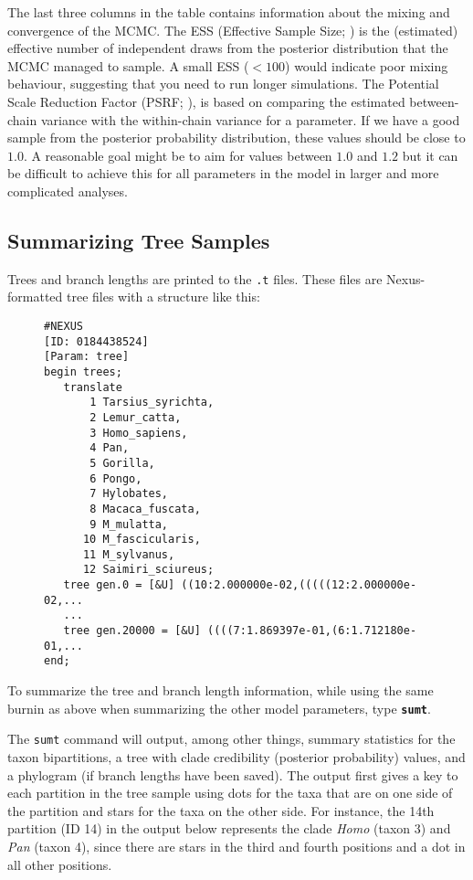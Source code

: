 \documentclass[12pt]{book}
\newcommand{\ttt}[1]{\texttt{#1}}
\newcommand{\tb}[1]{\ttt{\textbf{#1}}}
\begin{document}
The last three columns in the table contains information about the mixing and convergence of the
MCMC. The ESS (Effective Sample Size; \citet{ripley87}) is the (estimated) effective number of
independent draws from the posterior distribution that the MCMC managed to sample. A small ESS
($<100$) would indicate poor mixing behaviour, suggesting that you need to run longer simulations.
The Potential Scale Reduction Factor (PSRF; \citet{gelman92}), is based on comparing the estimated
between-chain variance with the within-chain variance for a parameter. If we have a good sample
from the posterior probability distribution, these values should be close to $1.0$. A reasonable
goal might be to aim for values between $1.0$ and $1.2$ but it can be difficult to achieve this
for all parameters in the model in larger and more complicated analyses.

\subsection{Summarizing Tree Samples}

Trees and branch lengths are printed to the \texttt{.t} files. These files are Nexus-formatted tree
files with a structure like this:

\begin{figure}[H]
\centering
\begin{BVerbatim}
#NEXUS
[ID: 0184438524]
[Param: tree]
begin trees;
   translate
       1 Tarsius_syrichta,
       2 Lemur_catta,
       3 Homo_sapiens,
       4 Pan,
       5 Gorilla,
       6 Pongo,
       7 Hylobates,
       8 Macaca_fuscata,
       9 M_mulatta,
      10 M_fascicularis,
      11 M_sylvanus,
      12 Saimiri_sciureus;
   tree gen.0 = [&U] ((10:2.000000e-02,(((((12:2.000000e-02,...
   ...
   tree gen.20000 = [&U] ((((7:1.869397e-01,(6:1.712180e-01,...
end;
\end{BVerbatim}
\end{figure}

To summarize the tree and branch length information, while using the same burnin as above when
summarizing the other model parameters, type \tb{sumt}.

The \texttt{sumt} command will output, among other things, summary statistics for the taxon
bipartitions, a tree with clade credibility (posterior probability) values, and a phylogram (if
branch lengths have been saved). The output first gives a key to each partition in the tree sample
using dots for the taxa that are on one side of the partition and stars for the taxa on the other
side. For instance, the 14th partition (ID 14) in the output below represents the clade
\textit{Homo} (taxon 3) and \textit{Pan} (taxon 4), since there are stars in the third and fourth
positions and a dot in all other positions.
\end{document}
